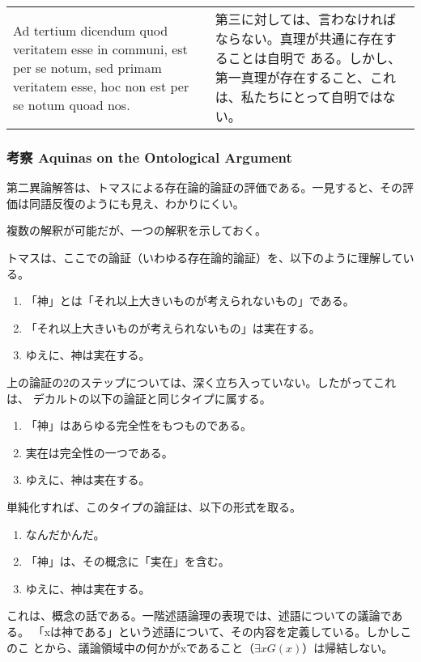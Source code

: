 \documentclass[10pt]{jsarticle}
\begin{document}
\begin{longtable}{p{21em}p{21em}}
\\

{\sc Ad tertium dicendum} quod veritatem esse in communi, est per se
notum, sed primam veritatem esse, hoc non est per se notum quoad nos.

&

第三に対しては、言わなければならない。真理が共通に存在することは自明で
ある。しかし、第一真理が存在すること、これは、私たちにとって自明ではな
い。

\end{longtable}
\newpage
\subsubsection*{考察 Aquinas on the Ontological Argument}
第二異論解答は、トマスによる存在論的論証の評価である。一見すると、その評
価は同語反復のようにも見え、わかりにくい。

複数の解釈が可能だが、一つの解釈を示しておく。

トマスは、ここでの論証（いわゆる存在論的論証）を、以下のように理解してい
る。

\begin{enumerate}
 \item 「神」とは「それ以上大きいものが考えられないもの」である。
 \item 「それ以上大きいものが考えられないもの」は実在する。
 \item ゆえに、神は実在する。
\end{enumerate}

上の論証の2のステップについては、深く立ち入っていない。したがってこれは、
デカルトの以下の論証と同じタイプに属する。

\begin{enumerate}
 \item 「神」はあらゆる完全性をもつものである。
 \item 実在は完全性の一つである。
 \item ゆえに、神は実在する。
\end{enumerate}

単純化すれば、このタイプの論証は、以下の形式を取る。

\begin{enumerate}
 \item なんだかんだ。
 \item 「神」は、その概念に「実在」を含む。
 \item ゆえに、神は実在する。
\end{enumerate}
\noindent
これは、概念の話である。一階述語論理の表現では、述語についての議論である。
「xは神である」という述語について、その内容を定義している。しかしこのこ
とから、議論領域中の何かがxであること（$\exists xG(x)$）は帰結しない。
\end{document}
